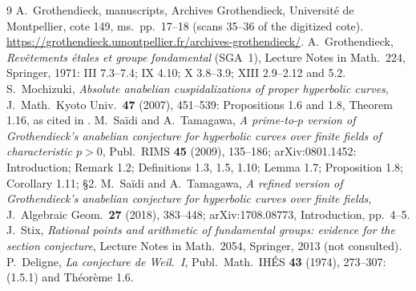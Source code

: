 \documentclass[11pt]{amsart}
\theoremstyle{remark}
\begin{document}
\begin{thebibliography}{9}
 A.~Grothendieck, manuscripts, Archives Grothendieck, Universit\'e de Montpellier, cote 149, ms.~pp.~17--18 (scans 35--36 of the digitized cote). \url{https://grothendieck.umontpellier.fr/archives-grothendieck/}.
 A.~Grothendieck, \emph{Rev\^etements \'etales et groupe fondamental} (SGA~1), Lecture Notes in Math.\ 224, Springer, 1971: III 7.3--7.4; IX 4.10; X 3.8--3.9; XIII 2.9--2.12 and 5.2.
 S.~Mochizuki, \emph{Absolute anabelian cuspidalizations of proper hyperbolic curves}, J.\ Math.\ Kyoto Univ.\ \textbf{47} (2007), 451--539: Propositions 1.6 and 1.8, Theorem 1.16, as cited in \cite[\S 2]{ST09}.
 M.~Sa\"idi and A.~Tamagawa, \emph{A prime-to-$p$ version of Grothendieck's anabelian conjecture for hyperbolic curves over finite fields of characteristic $p>0$}, Publ.\ RIMS \textbf{45} (2009), 135--186; arXiv:0801.1452: Introduction; Remark 1.2; Definitions 1.3, 1.5, 1.10; Lemma 1.7; Proposition 1.8; Corollary 1.11; \S 2.
 M.~Sa\"idi and A.~Tamagawa, \emph{A refined version of Grothendieck's anabelian conjecture for hyperbolic curves over finite fields}, J.\ Algebraic Geom.\ \textbf{27} (2018), 383--448; arXiv:1708.08773, Introduction, pp.~4--5.
 J.~Stix, \emph{Rational points and arithmetic of fundamental groups: evidence for the section conjecture}, Lecture Notes in Math.\ 2054, Springer, 2013 (not consulted).
 P.~Deligne, \emph{La conjecture de Weil.~I}, Publ.\ Math.\ IH\'ES \textbf{43} (1974), 273--307: (1.5.1) and Th\'eor\`eme 1.6.
\end{thebibliography}
\end{document}
